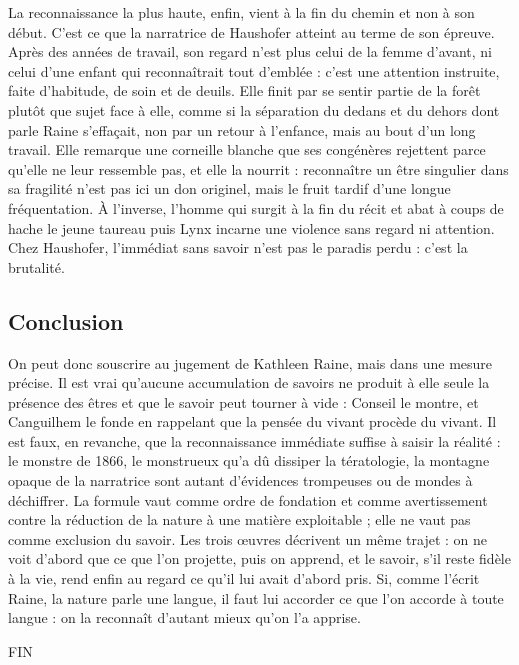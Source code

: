 \documentclass[11pt,a4paper]{article}
\begin{document}
La reconnaissance la plus haute, enfin, vient à la fin du chemin et non à son début. C'est ce que la narratrice de Haushofer atteint au terme de son épreuve. Après des années de travail, son regard n'est plus celui de la femme d'avant, ni celui d'une enfant qui reconnaîtrait tout d'emblée : c'est une attention instruite, faite d'habitude, de soin et de deuils. Elle finit par se sentir partie de la forêt plutôt que sujet face à elle, comme si la séparation du dedans et du dehors dont parle Raine s'effaçait, non par un retour à l'enfance, mais au bout d'un long travail. Elle remarque une corneille blanche que ses congénères rejettent parce qu'elle ne leur ressemble pas, et elle la nourrit : reconnaître un être singulier dans sa fragilité n'est pas ici un don originel, mais le fruit tardif d'une longue fréquentation. À l'inverse, l'homme qui surgit à la fin du récit et abat à coups de hache le jeune taureau puis Lynx incarne une violence sans regard ni attention. Chez Haushofer, l'immédiat sans savoir n'est pas le paradis perdu : c'est la brutalité.

\hypertarget{conclusion}{%
\subsection{Conclusion}\label{conclusion}}

On peut donc souscrire au jugement de Kathleen Raine, mais dans une mesure précise. Il est vrai qu'aucune accumulation de savoirs ne produit à elle seule la présence des êtres et que le savoir peut tourner à vide : Conseil le montre, et Canguilhem le fonde en rappelant que la pensée du vivant procède du vivant. Il est faux, en revanche, que la reconnaissance immédiate suffise à saisir la réalité : le monstre de 1866, le monstrueux qu'a dû dissiper la tératologie, la montagne opaque de la narratrice sont autant d'évidences trompeuses ou de mondes à déchiffrer. La formule vaut comme ordre de fondation et comme avertissement contre la réduction de la nature à une matière exploitable ; elle ne vaut pas comme exclusion du savoir. Les trois œuvres décrivent un même trajet : on ne voit d'abord que ce que l'on projette, puis on apprend, et le savoir, s'il reste fidèle à la vie, rend enfin au regard ce qu'il lui avait d'abord pris. Si, comme l'écrit Raine, la nature parle une langue, il faut lui accorder ce que l'on accorde à toute langue : on la reconnaît d'autant mieux qu'on l'a apprise.

FIN
\end{document}

